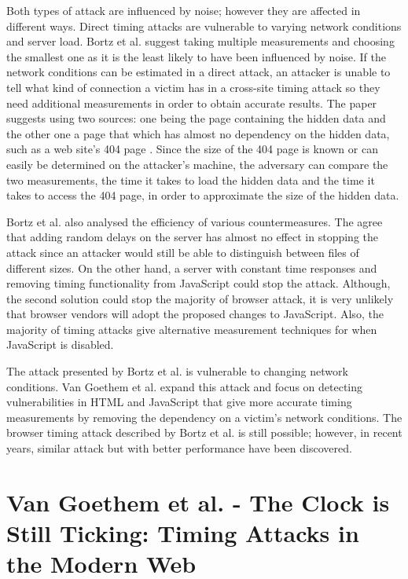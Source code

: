 \documentclass[10pt,a4paper,twoside]{book}
\begin{document}
Both types of attack are influenced by noise; however they are affected in different ways. Direct timing attacks are vulnerable to varying network conditions and server load. Bortz et al. suggest taking multiple measurements and choosing the smallest one as it is the least likely to have been influenced by noise. If the network conditions can be estimated in a direct attack, an attacker is unable to tell what kind of connection a victim has in a cross-site timing attack so they need additional measurements in order to obtain accurate results. The paper suggests using two sources: one being the page containing the hidden data and the other one a page that which has almost no dependency on the hidden data, such as a web site's 404 page \cite{bortz2007exposing}. 
Since the size of the 404 page is known or can easily be determined on the attacker's machine, the adversary can compare the two measurements, the time it takes to load the hidden data and the time it takes to access the 404 page, in order to approximate the size of the hidden data.

Bortz et al. also analysed the efficiency of various countermeasures. The agree that adding random delays on the server has almost no effect in stopping the attack since an attacker would still be able to distinguish between files of different sizes. On the other hand, a server with constant time responses and removing timing functionality from JavaScript could stop the attack. Although, the second solution could stop the majority of browser attack, it is very unlikely that browser vendors will adopt the proposed changes to JavaScript. Also, the majority of timing attacks give alternative measurement techniques for when JavaScript is disabled.

The attack presented by Bortz et al. \cite{bortz2007exposing} is vulnerable to changing network conditions. Van Goethem et al. \cite{van2015clock} expand this attack and focus on detecting vulnerabilities in HTML and JavaScript that give more accurate timing measurements by removing the dependency on a victim's network  conditions. The browser timing attack described by Bortz et al. \cite{bortz2007exposing} is still possible; however, in recent years, similar attack but with better performance have been discovered. 

\section{Van Goethem et al. - The Clock is Still Ticking: Timing Attacks in the Modern Web}
\label{van}
\end{document}
